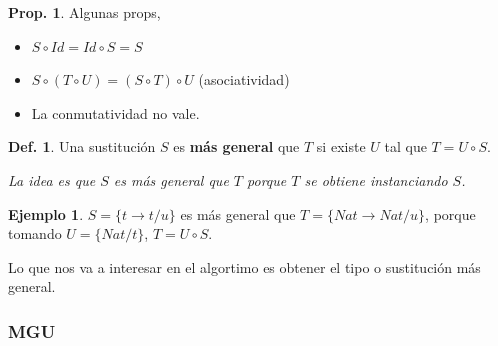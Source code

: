 \documentclass{report}
\theoremstyle{definition} %
\newtheorem{proposition}{Prop.}[chapter]
\newtheorem{definition}{Def.}[chapter]
\newtheorem{example}{Ejemplo}[chapter]
\newcommand{\tfunc}[2]{#1 \to #2}
\newcommand{\sustfor}[2]{#1/#2} %
\newcommand{\comp}[2]{#1 \circ #2}
\begin{document}
\begin{proposition} Algunas props,
    \begin{itemize}
        \item $\comp{S}{Id} = \comp{Id}{S} = S$
        \item $\comp{S}{(\comp{T}{U})} = \comp{(\comp{S}{T})}{U}$
        (asociatividad)
        \item La conmutatividad no vale.
    \end{itemize}
\end{proposition}

\begin{definition}
    Una sustitución $S$ es \textbf{más general} que $T$ si existe $U$ tal que $T
    = \comp{U}{S}$.

    \textit{La idea es que $S$ es más general que $T$ porque $T$ se obtiene instanciando $S$.}

    \begin{example}
        $S = \{ \sustfor{\tfunc{t}{t}}{u} \}$ es más general que
        $T = \{ \sustfor{\tfunc{Nat}{Nat}}{u} \}$, porque tomando
        $U = \{ \sustfor{Nat}{t}\}$, $T = \comp{U}{S}$.
    \end{example}

    Lo que nos va a interesar en el algortimo es obtener el tipo o sustitución
    más general.
\end{definition}

\subsubsection{MGU}
\end{document}
